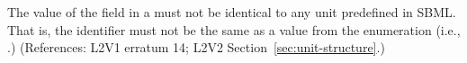 The value of the  field in a \UnitDefinition must not be
identical to any unit predefined in SBML.  That is, the identifier
must not be the same as a value from the 
enumeration (i.e.,
.)
(References: L2V1 erratum 14; L2V2
Section~\ref{sec:unit-structure}.)
